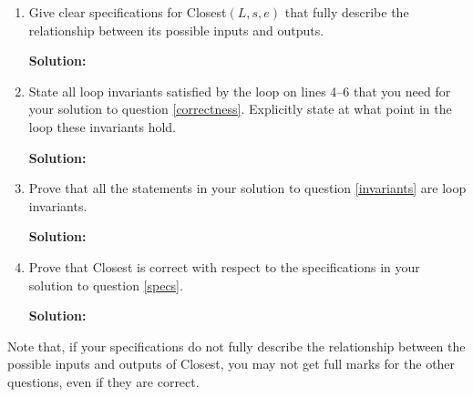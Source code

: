 \documentclass[11pt]{article}
\begin{document}
\begin{enumerate}
\item
\label{specs}
\begin{question}
Give clear specifications for Closest$(L,s,e)$ that fully describe
the relationship between its possible inputs and outputs.
\end{question}

\begin{solution}
{\bf Solution:}

\end{solution}

\item
\label{invariants}
\begin{question}
State all loop invariants satisfied by the loop on lines 4--6 that you need for your solution to question \ref{correctness}. Explicitly state at what point in the loop these invariants hold.
\end{question}

\begin{solution}
{\bf Solution:}

\end{solution}

\item
\begin{question}
Prove that all the statements in your solution to question \ref{invariants} are loop invariants.
\end{question}

\begin{solution}
{\bf Solution:}

\end{solution}

\item
\label{correctness}
\begin{question}
Prove that Closest is correct with respect to the specifications in your solution to question \ref{specs}.
\end{question}


\begin{solution}
{\bf Solution:}

\end{solution}
\end{enumerate}
\begin{question}
Note that, if your specifications do not fully describe the relationship between the possible inputs and outputs of Closest, you may not get full marks for the other questions, even if they are correct.
\end{question}
\end{document}
